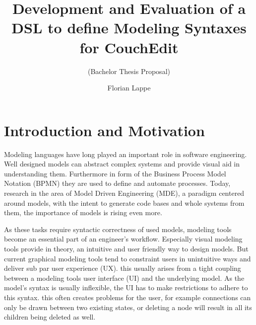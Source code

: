 \documentclass[10pt,a4paper,oneside]{scrartcl}
\title{Development and Evaluation of a DSL to define Modeling Syntaxes for CouchEdit}
\subtitle{(Bachelor Thesis Proposal)}
\author{Florian Lappe}
\newcommand\hint[2]{
\ifthenelse{\boolean{showhints}}{
\begin{center}
\colorbox{black!10}{
\begin{minipage}{.963\textwidth}
#2\hfill\textbf{#1}
\end{minipage}
}\end{center}}{}
}
\begin{document}
\maketitle

\section{Introduction and Motivation}
\label{sec:motivation}


Modeling languages have long played an important role in software engineering. Well designed models can abstract complex systems and provide visual aid in understanding them. Furthermore in form of the Business Process Model Notation (BPMN) they are used to define and automate processes. Today, research in the area of Model Driven Engineering (MDE), a paradigm centered around models, with the intent to generate code bases and whole systems from them, the importance of models is rising even more.

As these tasks require syntactic correctness of used models, modeling tools become an essential part of an engineer's workflow. Especially visual modeling tools provide in theory, an intuitive and user friendly way to design models. But current graphical modeling tools tend to constraint users in unintuitive ways and deliver sub par user experience (UX). this usually arises from a tight coupling between a modeling tools user interface (UI) and the underlying model. As the model's syntax is usually inflexible, the UI has to make restrictions to adhere to this syntax. this often creates problems for the user, for example connections can only be drawn between two existing states, or deleting a node will result in all its children being deleted as well.
\end{document}
